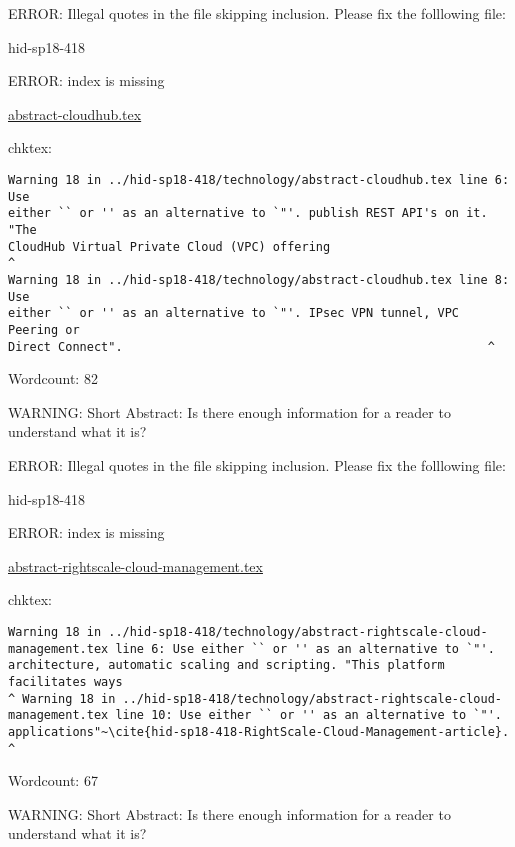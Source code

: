 ERROR: Illegal quotes in the file skipping inclusion. Please fix the folllowing file:

\begin{IU}

hid-sp18-418

ERROR: index is missing

\href{https://github.com/cloudmesh-community/hid-sp18-418/blob/master//technology/abstract-cloudhub.tex}{abstract-cloudhub.tex}

 
chktex:
\begin{tiny}
\begin{verbatim}
Warning 18 in ../hid-sp18-418/technology/abstract-cloudhub.tex line 6: Use
either `` or '' as an alternative to `"'. publish REST API's on it. "The
CloudHub Virtual Private Cloud (VPC) offering                              ^
Warning 18 in ../hid-sp18-418/technology/abstract-cloudhub.tex line 8: Use
either `` or '' as an alternative to `"'. IPsec VPN tunnel, VPC Peering or
Direct Connect".                                                   ^
\end{verbatim}
\end{tiny}

Wordcount: 82

WARNING: Short Abstract: Is there enough information for a reader to understand what it is?

\end{IU}

ERROR: Illegal quotes in the file skipping inclusion. Please fix the folllowing file:

\begin{IU}

hid-sp18-418

ERROR: index is missing

\href{https://github.com/cloudmesh-community/hid-sp18-418/blob/master//technology/abstract-rightscale-cloud-management.tex}{abstract-rightscale-cloud-management.tex}

 
chktex:
\begin{tiny}
\begin{verbatim}
Warning 18 in ../hid-sp18-418/technology/abstract-rightscale-cloud-
management.tex line 6: Use either `` or '' as an alternative to `"'.
architecture, automatic scaling and scripting. "This platform facilitates ways
^ Warning 18 in ../hid-sp18-418/technology/abstract-rightscale-cloud-
management.tex line 10: Use either `` or '' as an alternative to `"'.
applications"~\cite{hid-sp18-418-RightScale-Cloud-Management-article}.
^
\end{verbatim}
\end{tiny}

Wordcount: 67

WARNING: Short Abstract: Is there enough information for a reader to understand what it is?

\end{IU}


